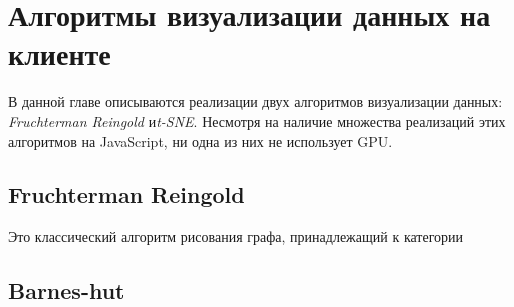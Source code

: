 


\chapter{Алгоритмы визуализации данных на клиенте}

В данной главе описываются реализации двух алгоритмов визуализации данных: {\itshape Fruchterman Reingold} и{\itshape t-SNE}. Несмотря на наличие множества реализаций этих алгоритмов на JavaScript, ни одна из них не использует GPU.

\section{Fruchterman Reingold}

Это классический алгоритм рисования графа, принадлежащий к категории 

\section{Barnes-hut}

